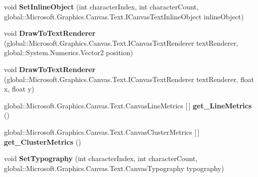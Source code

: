 \begin{DoxyCompactItemize}
void {\bfseries Set\+Inline\+Object} (int character\+Index, int character\+Count, global\+::\+Microsoft.\+Graphics.\+Canvas.\+Text.\+I\+Canvas\+Text\+Inline\+Object inline\+Object)
\item 
\mbox{\label{class_microsoft_1_1_graphics_1_1_canvas_1_1_text_1_1_canvas_text_layout_adcedc6eac15894cd67db704b047bb206}} 
void {\bfseries Draw\+To\+Text\+Renderer} (global\+::\+Microsoft.\+Graphics.\+Canvas.\+Text.\+I\+Canvas\+Text\+Renderer text\+Renderer, global\+::\+System.\+Numerics.\+Vector2 position)
\item 
\mbox{\label{class_microsoft_1_1_graphics_1_1_canvas_1_1_text_1_1_canvas_text_layout_ae94965b9797ceb30515e3352cba05fdd}} 
void {\bfseries Draw\+To\+Text\+Renderer} (global\+::\+Microsoft.\+Graphics.\+Canvas.\+Text.\+I\+Canvas\+Text\+Renderer text\+Renderer, float x, float y)
\item 
\mbox{\label{class_microsoft_1_1_graphics_1_1_canvas_1_1_text_1_1_canvas_text_layout_aeb404118734ea91e7bee88ebc313cec1}} 
global\+::\+Microsoft.\+Graphics.\+Canvas.\+Text.\+Canvas\+Line\+Metrics \mbox{[}$\,$\mbox{]} {\bfseries get\+\_\+\+Line\+Metrics} ()
\item 
\mbox{\label{class_microsoft_1_1_graphics_1_1_canvas_1_1_text_1_1_canvas_text_layout_a0d448b366382895fac2e94fc9b2358dd}} 
global\+::\+Microsoft.\+Graphics.\+Canvas.\+Text.\+Canvas\+Cluster\+Metrics \mbox{[}$\,$\mbox{]} {\bfseries get\+\_\+\+Cluster\+Metrics} ()
\item 
\mbox{\label{class_microsoft_1_1_graphics_1_1_canvas_1_1_text_1_1_canvas_text_layout_aae0bff9344ddf4205aab37ecf0fdb8f4}} 
void {\bfseries Set\+Typography} (int character\+Index, int character\+Count, global\+::\+Microsoft.\+Graphics.\+Canvas.\+Text.\+Canvas\+Typography typography)
\item 
\mbox{\label{class_microsoft_1_1_graphics_1_1_canvas_1_1_text_1_1_canvas_text_layout_aa9de23a3678c4be132aa53e6409d9777}} 

\end{DoxyCompactItemize}
